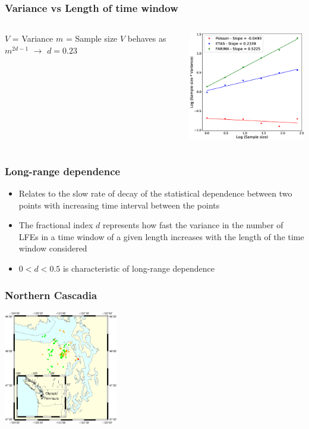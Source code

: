 \documentclass{beamer}
\begin{document}
	\begin{frame}
		\frametitle{Variance vs Length of time window}
		\begin{columns}[c]
			\begin{column}{5cm}
				$V$ = Variance
				$m$ = Sample size
				$V$ behaves as $m^{2 d - 1}$
				$\rightarrow$ $d =  0.23$
			\end{column}
			\begin{column}{7cm}
				\begin{center}
					\includegraphics[width=7cm, trim={0cm 0cm 0cm 0cm}, clip]{other/comparison.eps}
				\end{center}
			\end{column}
		\end{columns}
	\end{frame}

	\begin{frame}
		\frametitle{Long-range dependence}
		\begin{itemize}
			\item Relates to the slow rate of decay of the statistical dependence between two points with increasing time interval between the points
			\item The fractional index $d$ represents how fast the variance in the number of LFEs in a time window of a given length increases with the length of the time window considered
			\item $0 < d < 0.5$ is characteristic of long-range dependence
		\end{itemize}
	\end{frame}

	\begin{frame}
		\frametitle{Northern Cascadia}
		\begin{center}
			\includegraphics[width=5cm, trim={1cm 2cm 2cm 2cm}, clip]{other/cascadia.eps}
		\end{center}
	\end{frame}
\end{document}
